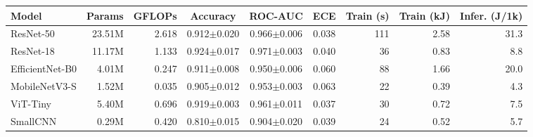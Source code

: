 \begin{tabular}{lrrcccrrr}
\toprule
Model & Params & GFLOPs & Accuracy & ROC-AUC & ECE & Train (s) & Train (kJ) & Infer. (J/1k) \\
\midrule
ResNet-50 & 23.51M & 2.618 & 0.912$\pm$0.020 & 0.966$\pm$0.006 & 0.038 & 111 & 2.58 & 31.3 \\
ResNet-18 & 11.17M & 1.133 & 0.924$\pm$0.017 & 0.971$\pm$0.003 & 0.040 & 36 & 0.83 & 8.8 \\
EfficientNet-B0 & 4.01M & 0.247 & 0.911$\pm$0.008 & 0.950$\pm$0.006 & 0.060 & 88 & 1.66 & 20.0 \\
MobileNetV3-S & 1.52M & 0.035 & 0.905$\pm$0.012 & 0.953$\pm$0.003 & 0.063 & 22 & 0.39 & 4.3 \\
ViT-Tiny & 5.40M & 0.696 & 0.919$\pm$0.003 & 0.961$\pm$0.011 & 0.037 & 30 & 0.72 & 7.5 \\
SmallCNN & 0.29M & 0.420 & 0.810$\pm$0.015 & 0.904$\pm$0.020 & 0.039 & 24 & 0.52 & 5.7 \\
\bottomrule
\end{tabular}